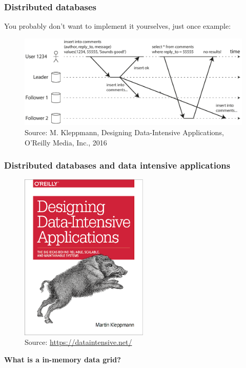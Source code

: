 \documentclass[10pt,utf8]{beamer}
\begin{document}
\begin{frame}
	\frametitle{Distributed databases}
	You probably don't want to implement it yourselves, just once example:
	\begin{figure}
		\centering
		\includegraphics[width=12cm]{./img/read-after-write-consistency.eps}
		\caption{\tiny{Source: M. Kleppmann, Designing Data-Intensive Applications, O'Reilly Media, Inc., 2016}}
	\end{figure}
\end{frame}

\begin{frame}
	\frametitle{Distributed databases and data intensive applications}
	\begin{figure}
		\centering
		\includegraphics[height=8cm]{./img/ddia.eps}
		\caption{\tiny{Source: \url{https://dataintensive.net/}}}
	\end{figure}
\end{frame}


\begin{frame}
	\centering
	\huge{\textbf{What is a in-memory data grid?}}
\end{frame}
\end{document}
